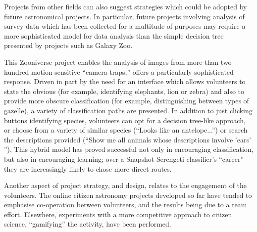 \documentclass{ar2e}
\begin{document}

Projects from other fields can also suggest strategies which could be adopted
by future astronomical projects. In particular, future projects involving
analysis of survey data which has been collected for a multitude of purposes
may require a more sophisticated model for data analysis than the simple
decision tree presented by projects such as Galaxy Zoo. 

  This Zooniverse project enables the analysis of
images from more than two hundred motion-sensitive ``camera traps,'' offers a
particularly sophisticated response. Driven in part by the need for an interface
which allows volunteers to state the obvious (for example, identifying
elephants, lion or zebra) and also to provide more obscure classification (for
example, distinguishing between types of gazelle), a variety of classification
paths are presented. In addition to just clicking buttons identifying species,
volunteers can opt for a decision tree-like approach, or choose from a variety
of similar species (``Looks like an antelope...'') or search the descriptions
provided (``Show me all animals whose descriptions involve 'ears' ''). This
hybrid model has proved successful not only in encouraging classification, but
also in encouraging learning; over a Snapshot Serengeti classifier's ``career''
they are increasingly likely to chose more direct routes.



Another aspect of project strategy, and design, relates to the engagement of the
volunteers. The online citizen astronomy projects developed so far have tended
to emphasise co-operation between volunteers, and the results being due to a
team effort. Elsewhere, experiments with a more competitive approach to citizen
science, ``gamifying'' the activity, have been performed.
\end{document}
